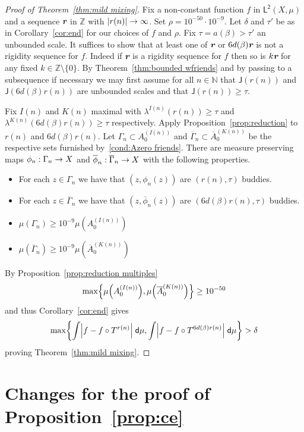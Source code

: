 \documentclass[10pt]{amsart}
\theoremstyle{definition}\newtheorem{defi}[theo]{Definition}\newtheorem{rema}[theo]{Remark}\newtheorem{exam}[theo]{Example}\newtheorem{exem}[theo]{Example}\newtheorem{nota}[theo]{Notation}
\newcommand{\N}{\mathbb{N}}
\newcommand{\Z}{\mathbb{Z}}
\newcommand{\intd}{\;\mathsf{d}}
\newcommand{\lp}{\mathsf{L}}
\newcommand{\ltwo}{\lp^{\!\mathsf{2}}}
\newcommand{\scl}{\mathsf{J}}
\def\mathbi#1{\textbf{\em #1}}
\newcommand{\bir}{\mathbi{r}}
\let\originalleft\left
\let\originalright\right
\renewcommand{\left}{\mathopen{}\mathclose\bgroup\originalleft}
\renewcommand{\right}{\aftergroup\egroup\originalright}
\renewcommand*{\to}{\mathchoice{\longrightarrow}{\rightarrow}{\rightarrow}{\rightarrow}}
\begin{document}
\begin{proof}[Proof of Theorem~\ref{thm:mild mixing}]
Fix a non-constant function $f$ in $\ltwo(X,\mu)$ and a sequence $ \bir$ in $\Z$ with $|r(n)| \to \infty$. Set $\rho=10^{-50}\cdot 10^{-9}$. Let $\delta$ and $\tau'$ be as in Corollary~\ref{cor:end} for our choices of $f$ and $\rho$. Fix $\tau = a(\beta) > \tau'$ an unbounded scale. It suffices to show that at least one of $ \bir$ or $6 d(\beta)  \bir$ is not a rigidity sequence for $f$. Indeed if $ \bir$ is a rigidity sequence for $f$ then so is $k  \bir$ for any fixed $k \in
\Z\setminus \{0\}$. By Theorem~\ref{thm:bounded wfriends} and by passing to a subsequence if necessary we may first assume for all $n \in \N$ that $\scl(r(n))$ and $\scl(6d(\beta) r(n))$ are unbounded scales and that $\scl(r(n)) \ge \tau$.

Fix $I(n)$ and $K(n)$ maximal with $\lambda^{I(n)}(r(n)) \ge \tau$ and $\lambda^{K(n)}(6d(\beta) r(n)) \ge \tau$ respectively. Apply Proposition~\ref{prop:reduction} to $r(n)$ and $6 d(\beta) r(n)$. Let $\Gamma_n \subset A^{(I(n))}_0$ and $\overline{\Gamma}_n \subset
\overline{A}^{(K(n))}_0$ be the respective sets furnished by~\eqref{cond:Azero friends}. There are measure preserving maps $\phi_n : \Gamma_n \to X$ and $\overline{\phi}_n : \overline{\Gamma}_n \to X$ with the following properties.
\begin{itemize}
\item For each $z \in \Gamma_n$ we have that $(z,\phi_n(z))$ are $(r(n),\tau)$ buddies.
\item For each $z \in \overline{\Gamma}_n$ we have that $(z,\overline{\phi}_n(z))$ are $(6d(\beta)r(n),\tau)$ buddies.
\item $\mu(\Gamma_n) \ge 10^{-9}\mu(A^{(I(n))}_0)$
\item $\mu(\overline{\Gamma}_n) \ge 10^{-9}\mu(\overline{A}^{(K(n))}_0)$
\end{itemize}
By Proposition~\ref{prop:reduction multiples}
\[
\max\left\{\mu\left(A^{(I(n))}_0\right), \mu\left(\overline{A}^{(K(n))}_0\right) \right\} \geq 10^{-50}
\]
and thus Corollary~\ref{cor:end} gives
\[
\max \left\{ \int \left|f-f\circ T^{r(n)}\right| \intd \mu,\int \left|f-f \circ T^{6d(\beta)r(n)}\right| \intd\mu \right\} > \delta
\]
proving Theorem~\ref{thm:mild mixing}.
\end{proof}



\appendix

\section{Changes for the proof of Proposition~\ref{prop:ce}}\label{app:ce_proof}
\end{document}
